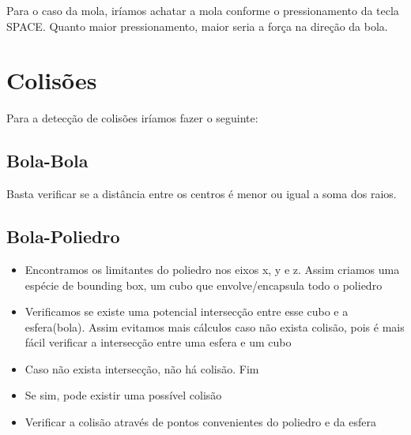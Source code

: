 \documentclass[a4paper,12pt]{article}
\begin{document}
Para o caso da mola, iríamos achatar a mola conforme o pressionamento da tecla SPACE. Quanto maior pressionamento, maior seria a força na direção da bola. 

\section{Colisões}
\mbox{}

Para a detecção de colisões iríamos fazer o seguinte:

\subsection{Bola-Bola}
\mbox{}

Basta verificar se a distância entre os centros é menor ou igual a soma dos raios.

\subsection{Bola-Poliedro}
\mbox{}

\begin{itemize}
\item Encontramos os limitantes do poliedro nos eixos x, y e z. Assim criamos uma espécie de bounding box, um cubo que envolve/encapsula todo o poliedro
\item Verificamos se existe uma potencial intersecção entre esse cubo e a esfera(bola). Assim evitamos mais cálculos caso não exista colisão, pois é mais
  fácil verificar a intersecção entre uma esfera e um cubo
\item Caso não exista intersecção, não há colisão. Fim
\item Se sim, pode existir uma possível colisão
\item Verificar a colisão através de pontos convenientes do poliedro e da esfera
  
\end{itemize}
\end{document}
